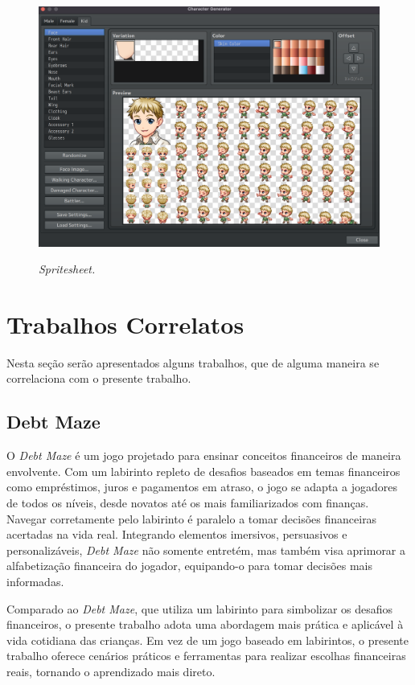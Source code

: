 \begin{figure}[ht]
	\centering
	\caption{\textit{Spritesheet.}}
	\includegraphics[scale=1.8]{Textuais/Pictures/Picture5.png}
	\label{fig:figure-5}
\end{figure}


\section{Trabalhos Correlatos}
Nesta seção serão apresentados alguns trabalhos, que de alguma maneira se correlaciona com o presente trabalho.

\subsection{Debt Maze}
O \textit{Debt Maze}\cite{Debt_Maze} é um jogo projetado para ensinar conceitos financeiros de maneira envolvente. Com um labirinto repleto de desafios baseados em temas financeiros como empréstimos, juros e pagamentos em atraso, o jogo se adapta a jogadores de todos os níveis, desde novatos até os mais familiarizados com finanças. Navegar corretamente pelo labirinto é paralelo a tomar decisões financeiras acertadas na vida real. Integrando elementos imersivos, persuasivos e personalizáveis, \textit{Debt Maze}\cite{Debt_Maze} não somente entretém, mas também visa aprimorar a alfabetização financeira do jogador, equipando-o para tomar decisões mais informadas.

Comparado ao \textit{Debt Maze}\cite{Debt_Maze}, que utiliza um labirinto para simbolizar os desafios financeiros, o presente trabalho adota uma abordagem mais prática e aplicável à vida cotidiana das crianças. Em vez de um jogo baseado em labirintos, o presente trabalho oferece cenários práticos e ferramentas para realizar escolhas financeiras reais, tornando o aprendizado mais direto.

